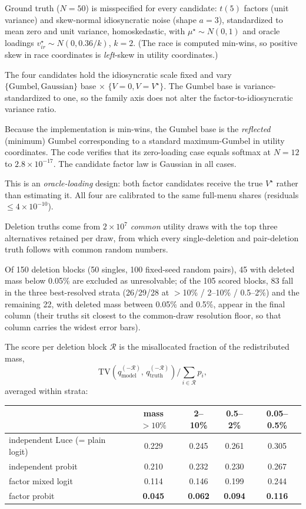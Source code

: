 \documentclass[12pt]{article}
\theoremstyle{remark}
\begin{document}
Ground truth ($N = 50$) is misspecified for every candidate: $t(5)$ factors
(unit variance) and skew-normal idiosyncratic noise (shape $a = 3$),
standardized to mean zero and unit variance, homoskedastic, with $\mu^\star
\sim N(0,1)$ and oracle loadings $v^\star_{ir} \sim N(0, 0.36/k)$, $k=2$.
(The race is computed min-wins, so positive skew in race coordinates is
\emph{left}-skew in utility coordinates.)

The four candidates hold the idiosyncratic scale fixed and vary
$\{\text{Gumbel}, \text{Gaussian}\}$ base $\times$ $\{V = 0, V =
V^\star\}$. The Gumbel base is variance-standardized to one, so the
family axis does not alter the factor-to-idiosyncratic variance ratio.

Because the implementation is min-wins, the Gumbel base is the
\emph{reflected} (minimum) Gumbel corresponding to a standard
maximum-Gumbel in utility coordinates. The code verifies that
its zero-loading case equals softmax at $N=12$ to $2.8\times10^{-17}$.
The candidate factor law is Gaussian in all cases.

This is an \emph{oracle-loading} design: both factor
candidates receive the true $V^\star$ rather than estimating it. All four
are calibrated to the same full-menu shares (residuals $\le
4\times10^{-10}$).

Deletion truths come from $2\times10^7$ \emph{common} utility draws with
the top three alternatives retained per draw, from which every
single-deletion and pair-deletion truth follows with common random numbers.

Of 150 deletion blocks (50 singles, 100 fixed-seed random pairs), 45 with
deleted mass below 0.05\% are excluded as unresolvable; of the 105 scored
blocks, 83 fall in the three best-resolved strata (26/29/28 at $>$10\% /
2--10\% / 0.5--2\%) and the remaining 22, with deleted mass between
0.05\% and 0.5\%, appear in the final column (their truths sit closest to
the common-draw resolution floor, so that column carries the widest error
bars).

The score per deletion block $\mathcal{R}$ is the
misallocated fraction of the redistributed mass,
\[
\mathrm{TV}\!\left(q^{(-\mathcal{R})}_{\mathrm{model}},\,
q^{(-\mathcal{R})}_{\mathrm{truth}}\right) \Big/ \textstyle\sum_{i \in \mathcal{R}} p_i ,
\]
averaged within strata:

\begin{center}
\begin{tabular}{lcccc}
\toprule
 & mass $>10\%$ & 2--10\% & 0.5--2\% & 0.05--0.5\% \\
\midrule
independent Luce (= plain logit) & 0.229 & 0.245 & 0.261 & 0.305 \\
independent probit & 0.210 & 0.232 & 0.230 & 0.267 \\
factor mixed logit & 0.114 & 0.146 & 0.199 & 0.244 \\
factor probit & \textbf{0.045} & \textbf{0.062} & \textbf{0.094} & \textbf{0.116} \\
\bottomrule
\end{tabular}
\end{center}
\end{document}
